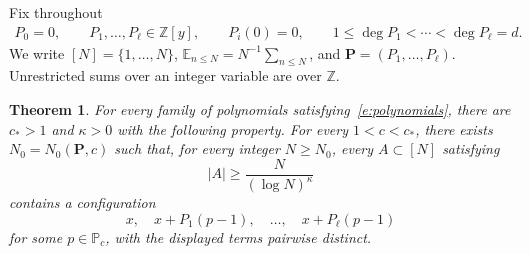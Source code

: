 \documentclass[12pt]{amsart}
\newcommand{\E}{\mathbb E}
\newcommand{\N}{\mathbb N}
\newcommand{\Z}{\mathbb Z}
\newcommand{\1}{\mathbf 1}
\newtheorem{theorem}{Theorem}[section]
\begin{document}
Fix throughout
\begin{equation}\label{e:polynomials}
 \begin{gathered}
 P_0=0,\qquad P_1,\ldots,P_\ell\in\Z[y],\qquad P_i(0)=0,\qquad
 1\leq\deg P_1<\cdots<\deg P_\ell=d.
 \end{gathered}
\end{equation}
We write $[N]=\{1,\ldots,N\}$,
$\E_{n\leq N}=N^{-1}\sum_{n\leq N}$, and
$\mathbf P=(P_1,\ldots,P_\ell)$. Unrestricted sums over an integer
variable are over $\Z$. 






\begin{theorem}
\label{t:szemeredi}
For every family of polynomials satisfying~\eqref{e:polynomials},
there are $c_*>1$ and $\kappa>0$ with the following property.
For every $1<c<c_*$, there exists $N_0=N_0(\mathbf P,c)$ such
that, for every integer $N\geq N_0$, every $A\subset[N]$
satisfying
\[
 |A|\geq\frac{N}{(\log N)^\kappa}
\]
contains a configuration
\begin{equation}\label{e:pattern}
 x,\quad x+P_1(p-1),\quad\ldots,\quad x+P_\ell(p-1)
\end{equation}
for some $p\in\mathbb P_c$, with the displayed terms
pairwise distinct.
\end{theorem}
\end{document}
